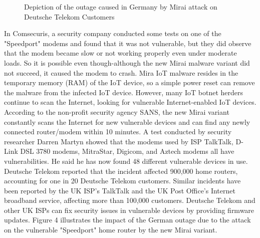 \documentclass[conference]{IEEEtran}
\begin{document}
\begin{itemize}
{\begin{figure}[htbp]
{}
\caption{Depiction of the outage caused in Germany by Mirai attack on
Deutsche Telekom Customers \cite{b2}}
\label{fig}
\end{figure}

In \cite{b20} Comsecuris, a security company conducted some tests on one of the "Speedport" modems and found that it was not vulnerable, but they did observe that the modem became slow or not working properly even under moderate loads. So it is possible even though-although the new Mirai malware variant did not succeed, it caused the modem to crash. Mira IoT malware resides in the temporary memory (RAM) of the IoT device, so a simple power reset can remove the malware from the infected IoT device. However, many IoT botnet herders continue to scan the Internet, looking for vulnerable Internet-enabled IoT devices. According to the non-profit security agency SANS, the new Mirai variant constantly scans the Internet for new vulnerable devices and can find any newly connected router/modem within 10 minutes. A test conducted by security researcher Darren Martyn showed that the modems used by ISP TalkTalk, D-Link DSL 3780 modems, MitraStar, Digicom, and Aztech modems all have vulnerabilities. He said he has now found 48 different vulnerable devices in use. Deutsche Telekom reported that the incident affected 900,000 home routers, accounting for one in 20 Deutsche Telekom customers. Similar incidents have been reported by the UK ISP’s TalkTalk and the UK Post Office’s Internet broadband service, affecting more than 100,000 customers. Deutsche Telekom and other UK ISPs can fix security issues in vulnerable devices by providing firmware updates. Figure 4 illustrates the impact of the German outage due to the attack on the vulnerable "Speedport" home router by the new Mirai variant.}



\end{itemize}
\end{document}
